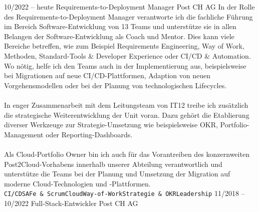 \documentclass[10pt]{developercv} %
\begin{document}
\begin{center}
\end{center}



\begin{entrylist}
	\entry
	{\footnotesize 10/2022 -- heute}
	{Requirements-to-Deployment Manager}
	{Post CH AG}
	{In der Rolle des Requirements-to-Deployment Manager verantworte ich die fachliche Führung im Bereich Software-Entwicklung von 13 Teams und unterstütze sie in allen Belangen der Software-Entwicklung als Coach und Mentor. Dies kann viele Bereiche betreffen, wie zum Beispiel Requirements Engineering, Way of Work, Methoden, Standard-Tools \& Developer Experience oder CI/CD \& Automation. Wo nötig, helfe ich den Teams auch in der Implementierung aus, beispielsweise bei Migrationen auf neue CI/CD-Plattformen, Adaption von neuen Vorgehensmodellen oder bei der Planung von technologischen Lifecycles.\\ \\
		In enger Zusammenarbeit mit dem Leitungsteam von IT12 treibe ich zusätzlich die strategische Weiterentwicklung der Unit voran. Dazu gehört die Etablierung diverser Werkzeuge zur Strategie-Umsetzung wie beispielsweise OKR, Portfolio-Management oder Reporting-Dashboards.\\ \\
		Als Cloud-Portfolio Owner bin ich auch für das  Vorantreiben des konzernweiten Post2Cloud-Vorhabens innerhalb unserer Abteilung verantwortlich und unterstütze die Teams bei der Planung und Umsetzung der Migration auf moderne Cloud-Technologien und -Plattformen.\\ \small \texttt{CI/CD}\slashsep\texttt{SAFe \& Scrum}\slashsep\texttt{Cloud}\slashsep\texttt{Way-of-Work}\slashsep\texttt{Strategie \& OKR}\slashsep\texttt{Leadership}}
	\entry
	{\footnotesize 11/2018 -- 10/2022}
	{Full-Stack-Entwickler}
	{Post CH AG}

\end{entrylist}
\end{document}
